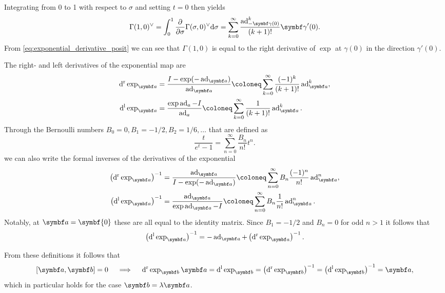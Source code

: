 Integrating from 0 to 1 with respect to $\sigma$ and setting $t = 0$ then yields
\begin{equation}
  \Gamma(1, 0)^\vee = \int_0^1 \frac{\partial}{\partial \sigma} \Gamma(\sigma, 0)^\vee \mathrm{d} \sigma = \sum_{k=0}^\infty \frac{\ad^k_{-\bgamma(0)}}{(k+1)!}\bgamma'(0).
\end{equation}
From \eqref{eq:exponential_derivative_posit} we can see that $\Gamma(1, 0)$ is equal to the right derivative of $\exp$ at $\gamma(0)$ in the direction $\gamma'(0)$.

\begin{properties}
  The right- and left derivatives of the exponential map are
  \begin{equation}
    \label{eq:dexp_def}
    \begin{aligned}
      \dr \exp_\a & = \frac{I - \exp (-\ad_{\a})}{\ad_{\a}} \coloneq \sum_{k=0}^\infty \frac{(-1)^k }{(k+1)!} \ad^k_{\a}, \\
      \dl \exp_\a & = \frac{\exp \ad_{a} - I}{\ad_{a}} \coloneq \sum_{k=0}^\infty \frac{1 }{(k+1)!} \ad^k_{\a}.
    \end{aligned}
  \end{equation}
  Through the Bernoulli numbers $B_0 = 0, B_1 = -1/2, B_2 = 1/6, \ldots$ that are defined as
  \begin{equation}
    \label{eq:bernoulli_number_def}
    \frac{t}{e^t - 1} = \sum_{n=0}^\infty \frac{B_n}{n!} t^n.
  \end{equation}
  we can also write the formal inverses of the derivatives of the exponential
  \begin{equation}
    \label{eq:dexpinv_def}
    \begin{aligned}
      \left(\dr \exp_\a\right)^{-1} & = \frac{\ad_{\a}}{I - \exp (- \ad_{\a})} \coloneq \sum_{n=0}^\infty B_n \frac{(-1)^n}{n!} \ad_{\a}^n, \\
      \left(\dl \exp_\a\right)^{-1} & = \frac{\ad_{\a}}{\exp \ad_{\a} - I} \coloneq \sum_{n=0}^\infty B_n \frac{1}{n!} \ad_\a^n.
    \end{aligned}
  \end{equation}
  Notably, at $\a = \symbf{0}$ these are all equal to the identity matrix. Since $B_1 = -1/2$ and $B_n = 0$ for odd $n > 1$ it follows that
  \begin{equation}
    \left(\dl \exp_\a\right)^{-1} = -\ad_\a + \left(\dr \exp_\a\right)^{-1}.
  \end{equation}
\end{properties}
From these definitions it follows that
\begin{equation}
  \left[ \a, \b \right] = 0 \quad \implies \quad \dr \exp_{\b} \a = \dl \exp_\b = \left( \dr \exp_\b \right)^{-1} = \left( \dl \exp_\b \right)^{-1} = \a,
\end{equation}
which in particular holds for the case $\b = \lambda \a$.

